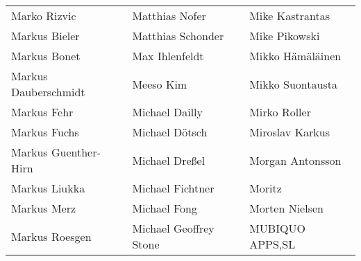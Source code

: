 \begin{tabular}{p{4.5cm}p{4.5cm}p{4.5cm}}
Marko Rizvic & Matthias Nofer & Mike Kastrantas \\
Markus Bieler & Matthias Schonder & Mike Pikowski \\
Markus Bonet & Max Ihlenfeldt & Mikko Hämäläinen \\
Markus Dauberschmidt & Meeso Kim & Mikko Suontausta \\
Markus Fehr & Michael Dailly & Mirko Roller \\
Markus Fuchs & Michael Dötsch & Miroslav Karkus \\
Markus Guenther-Hirn & Michael Dreßel & Morgan Antonsson \\
Markus Liukka & Michael Fichtner & Moritz \\
Markus Merz & Michael Fong & Morten Nielsen \\
Markus Roesgen & Michael Geoffrey Stone & MUBIQUO APPS,SL \\
\end{tabular}
\newpage
\setlength{\tabcolsep}{1mm}
